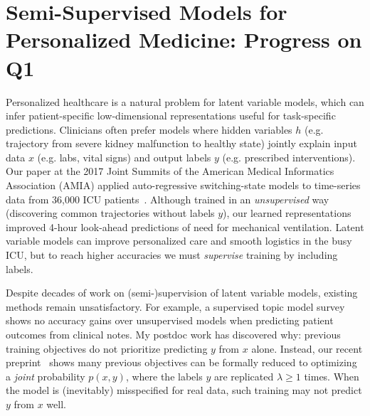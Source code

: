 \documentclass[11pt,letterpaper]{article}
\begin{document}

\section*{Semi-Supervised Models for Personalized Medicine: Progress on Q1}

Personalized healthcare is a natural problem for latent variable models, which can infer patient-specific low-dimensional representations useful for task-specific predictions.
Clinicians often prefer models where hidden variables $h$ (e.g. trajectory from severe kidney malfunction to healthy state) jointly explain input data $x$ (e.g. labs, vital signs) and output labels $y$ (e.g. prescribed interventions).
Our paper at the 2017 Joint Summits of the American Medical Informatics Association (AMIA) applied auto-regressive switching-state models to time-series data from 36,000 ICU patients~\citep{ghassemi2017ssam}.
Although trained in an \emph{unsupervised} way (discovering common trajectories without labels $y$), our learned representations improved 4-hour look-ahead predictions of need for mechanical ventilation. Latent variable models can improve personalized care and smooth logistics in the busy ICU, but 
to reach higher accuracies 
we must \emph{supervise} training by including labels.

Despite decades of work on (semi-)supervision of latent variable models, existing methods remain unsatisfactory. For example, a supervised topic model survey~\cite{halpern2012comparison} shows no accuracy gains over unsupervised models when predicting patient outcomes from clinical notes. 
My postdoc work has discovered why: previous training objectives do not prioritize predicting $y$ from $x$ alone. 
Instead, our recent preprint~\cite{hughes2017pc} shows many previous objectives \citep{blei2008sLDA,zhang2014howToSuperviseTopicModels,zhu2012medlda,ganchev2010posteriorconstraints} can be formally reduced to optimizing a \emph{joint} probability $p(x,y)$, where the labels $y$ are replicated $\lambda \geq 1$ times. When the model is (inevitably) misspecified for real data, 
such training may not predict $y$ from $x$ well.
\end{document}
